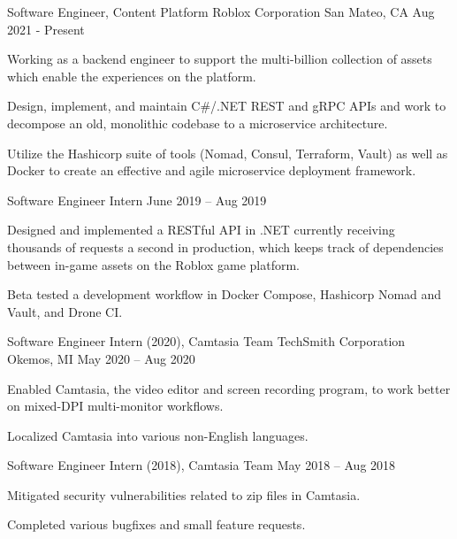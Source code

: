 \documentclass[]{awesome-cv}
\begin{document}
	\cventry
	{Software Engineer, Content Platform}
	{Roblox Corporation}
	{San Mateo, CA}
	{Aug 2021 - Present}
	{\begin{cvitems}
		\item{Working as a backend engineer to support the multi-billion collection of assets which enable the experiences on the platform.}
		\item{Design, implement, and maintain C\#/.NET REST and gRPC APIs and work to decompose an old, monolithic codebase to a microservice architecture.}
		\item{Utilize the Hashicorp suite of tools (Nomad, Consul, Terraform, Vault) as well as Docker to create an effective and agile microservice deployment framework.}
	\end{cvitems}}

	\vspace{-5mm}
	\cventry
	{Software Engineer Intern}
	{}
	{}
	{June 2019 – Aug 2019}
	{\begin{cvitems}
		\item {Designed and implemented a RESTful API in .NET currently receiving thousands of requests a second in production,
		 which keeps track of dependencies between in-game assets on the Roblox game platform.}
		\item {Beta tested a development workflow in Docker Compose, Hashicorp 
		Nomad and Vault, and Drone CI.}
	\end{cvitems}}

	\vspace{-4mm}
	\cventry
	{Software Engineer Intern (2020), Camtasia Team}
	{TechSmith Corporation}
	{Okemos, MI}
	{May 2020 – Aug 2020}
	{\begin{cvitems}
		\item {Enabled Camtasia, the video editor and screen recording program, to work better on mixed-DPI multi-monitor workflows.}
		\item {Localized Camtasia into various non-English languages.}
	\end{cvitems}}

	\vspace{-5mm}
	\cventry
	{Software Engineer Intern (2018), Camtasia Team}
	{}
	{}
	{May 2018 – Aug 2018}
	{\begin{cvitems}
		\item {Mitigated security vulnerabilities related to zip files in Camtasia.}
		\item {Completed various bugfixes and small feature requests.}
	\end{cvitems}}
\end{document}
